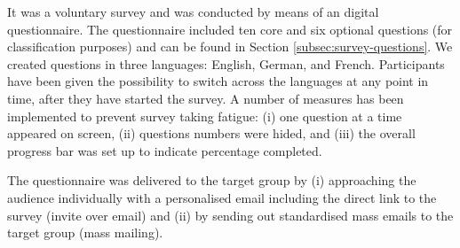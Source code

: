 \documentclass{article}
\begin{document}

It was a voluntary survey and was conducted by means of an digital questionnaire. The questionnaire included ten core and six optional questions (for classification purposes) and can be found in Section \ref{subsec:survey-questions}. We created questions in three languages: English, German, and French. Participants have been given the possibility to switch across the languages at any point in time, after they have started the survey. A number of measures has been implemented to prevent survey taking fatigue: (i) one question at a time appeared on screen, (ii) questions numbers were hided, and (iii) the overall progress bar was set up to indicate percentage completed.


The questionnaire was delivered to the target group by (i) approaching the audience individually with a personalised email including the direct link to the survey (invite over email) and (ii) by sending out standardised mass emails to the target group (mass mailing).
\end{document}
